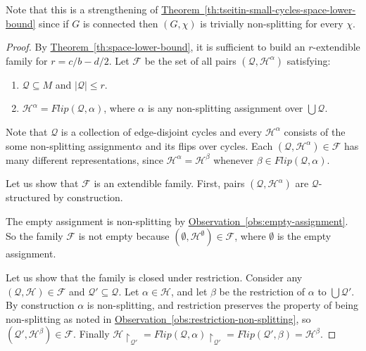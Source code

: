 \documentclass[11pt]{article}
\numberwithin{equation}{section}
\theoremstyle{definition}
\theoremstyle{plain}
\newcommand{\expref}[2]{\hyperref[#2]{#1~\ref{#2}}}
\theoremstyle{plain}
\theoremstyle{definition}
\newcommand{\refth}[1]{\expref{Theorem}{#1}}
\newcommand{\refobs}[1]{\expref{Observation}{#1}}
\newcommand{\setsize}[1]{\lvert#1\rvert}
\newcommand{\Union}{\bigcup}
\newcommand{\restrict}[2]{{{#1}\!\!\upharpoonright_{#2}}}
\newcommand{\connectivityexpansionnot}{c}
\newcommand{\cyclelengthnot}{b}
\newcommand{\nonsplitting}{non-splitting\xspace}
\newcommand{\nonsplittingassignment}{\nonsplitting assignment\xspace}
\newcommand{\Gnonsplittingnot}{non-splitting\xspace}
\newcommand{\Gnonsplitting}{\Gnonsplittingnot}
\newcommand{\flip}[2]{\mathit{Flip}(#1,#2)}
\newcommand{\emptyassignment}{\emptyset}
\newcommand{\kextendiblenot}{r}
\newcommand{\akextendible}{an \mbox{$\kextendiblenot$-ex}\-tend\-ible\xspace}
\newcommand{\kextendibleNok}{extendible\xspace}
\newcommand{\partitionnot}{\mathcal{Q}}
\newcommand{\assignmentsetnot}{\mathcal{H}}
\newcommand{\kextendfamily}{\ensuremath{\mathcal{F}}\xspace}
\newcommand{\tseitincharge}{\chi}
\begin{document}
Note that this is a strengthening of \expref{Theorem}{th:tseitin-small-cycles-space-lower-bound} since if $G$ is connected then $(G,\tseitincharge)$ is trivially \Gnonsplitting for every $\tseitincharge$.

\begin{proof}
  By \refth{th:space-lower-bound}, it is sufficient to build \akextendible family for $\kextendiblenot = \connectivityexpansionnot / \cyclelengthnot - d/2$. Let $\kextendfamily$ be the set of all pairs $(\partitionnot,\assignmentsetnot^\alpha)$ satisfying:
  \begin{enumerate}
  \item $\partitionnot\subseteq M$ and $\setsize{\partitionnot}\leq \kextendiblenot$.
  \item $\assignmentsetnot^{\alpha}=\flip{\partitionnot}{\alpha}$, where $\alpha$ is any \nonsplittingassignment over $\Union \partitionnot$.
  \end{enumerate}
  Note that $\partitionnot$ is a collection of edge-disjoint cycles and every $\assignmentsetnot^\alpha$ consists of the some \nonsplittingassignment $\alpha$ and its flips over cycles. Each $(\partitionnot,\assignmentsetnot^{\alpha}) \in \kextendfamily$ has many different representations, since $\assignmentsetnot^{\alpha}=\assignmentsetnot^{\beta}$ whenever $\beta\in\flip{\partitionnot}{\alpha}$.

  Let us show that $\kextendfamily$ is an \kextendibleNok family. First, pairs $(\partitionnot,\assignmentsetnot^{\alpha})$ are $\partitionnot$-structured by construction.
  
  The empty assignment is \nonsplitting by \refobs{obs:empty-assignment}. So the family $\kextendfamily$ is not empty because $(\emptyset,\assignmentsetnot^{\emptyassignment})\in\kextendfamily$, where $\emptyassignment$ is the empty assignment.

  Let us show that the family is closed under restriction. Consider any $(\partitionnot,\assignmentsetnot)\in\kextendfamily$ and $\partitionnot'\subseteq \partitionnot$. Let $\alpha\in\assignmentsetnot$, and let $\beta$ be the restriction of $\alpha$ to $\Union\partitionnot'$. By construction $\alpha$ is \nonsplitting, and restriction preserves the property of being \nonsplitting as noted in \refobs{obs:restriction-non-splitting}, so $(\partitionnot',\assignmentsetnot^{\beta})\in\kextendfamily$. Finally $\restrict{\assignmentsetnot}{\partitionnot'}=\restrict{\flip{\partitionnot}{\alpha}}{\partitionnot'}=\flip{\partitionnot'}{\beta}=\assignmentsetnot^{\beta}$.


\end{proof}
\end{document}
